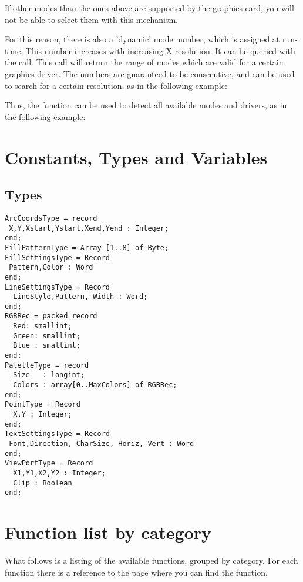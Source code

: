 
If other modes than the ones above are supported by the graphics card,
you will not be able to select them with this mechanism.

For this reason, there is also a 'dynamic' mode number, which is assigned at
run-time. This number increases with increasing X resolution. It can be
queried with the  call. This call will return the range
of modes which are valid for a certain graphics driver. The numbers are
guaranteed to be consecutive, and can be used to search for a certain 
resolution, as in the following example:



Thus, the  function can be used to detect all available 
modes and drivers, as in the following example:


\section{Constants, Types and Variables}
\subsection{Types}
\begin{verbatim}
ArcCoordsType = record
 X,Y,Xstart,Ystart,Xend,Yend : Integer;
end;
FillPatternType = Array [1..8] of Byte;
FillSettingsType = Record
 Pattern,Color : Word
end;
LineSettingsType = Record
  LineStyle,Pattern, Width : Word;
end;
RGBRec = packed record
  Red: smallint;
  Green: smallint;
  Blue : smallint;
end;
PaletteType = record
  Size   : longint;
  Colors : array[0..MaxColors] of RGBRec;
end;
PointType = Record
  X,Y : Integer;
end;
TextSettingsType = Record
 Font,Direction, CharSize, Horiz, Vert : Word
end;
ViewPortType = Record
  X1,Y1,X2,Y2 : Integer;
  Clip : Boolean
end;
\end{verbatim}

\section{Function list by category}
What follows is a listing of the available functions, grouped by category.
For each function there is a reference to the page where you can find the
function.
